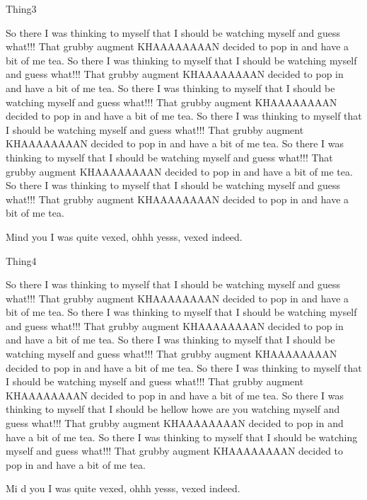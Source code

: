 \begin{define}{Thing3}

So there I was thinking to myself that I should be 
watching myself and guess what!!!
That grubby augment KHAAAAAAAAN decided to pop in and have a bit of
me tea. 
So there I was thinking to myself that I should be 
watching myself and guess what!!!
That grubby augment KHAAAAAAAAN decided to pop in and have a bit of
me tea. So there I was thinking to myself that I should be 
watching myself and guess what!!!
That grubby augment KHAAAAAAAAN decided to pop in and have a bit of
me tea. So there I was thinking to myself that I should be 
watching myself and guess what!!!
That grubby augment KHAAAAAAAAN decided to pop in and have a bit of
me tea. 
So there I was thinking to myself that I should be 
watching myself and guess what!!!
That grubby augment KHAAAAAAAAN decided to pop in and have a bit of
me tea. So there I was thinking to myself that I should be 
watching myself and guess what!!!
That grubby augment KHAAAAAAAAN decided to pop in and have a bit of
me tea. 

Mind you I was quite vexed, ohhh yesss, vexed indeed.   

\end{define}

\begin{define}{Thing4}

So there I was thinking to myself that I should be 
watching myself and guess what!!!
That grubby augment KHAAAAAAAAN decided to pop in and have a bit of
me tea. 
So there I was thinking to myself that I should be 
watching myself and guess what!!!
That grubby augment KHAAAAAAAAN decided to pop in and have a bit of
me tea. So there I was thinking to myself that I should be 
watching myself and guess what!!!
That grubby augment KHAAAAAAAAN decided to pop in and have a bit of
me tea. So there I was thinking to myself that I should be 
watching myself and guess what!!!
That grubby augment KHAAAAAAAAN decided to pop in and have a bit of
me tea. 
So there I was thinking to myself that I should be   hellow howe are you 
watching myself and guess what!!!
That grubby augment KHAAAAAAAAN decided to pop in and have a bit of
me tea. So there I was thinking to myself that I should be 
watching myself and guess what!!!
That grubby augment KHAAAAAAAAN decided to pop in and have a bit of
me tea. 

Mi  d you I was quite vexed, ohhh yesss, vexed indeed.   

\end{define}


